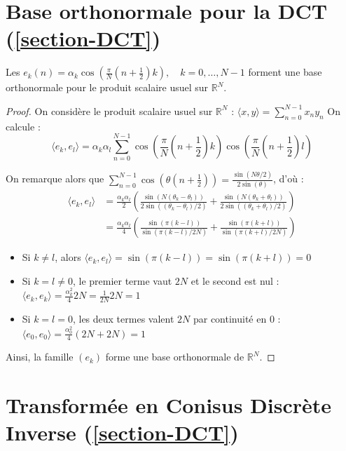\pagebreak

\section*{Base orthonormale pour la DCT (\ref{section-DCT})}
\label{preuve-base-DCT}

Les $ e_k(n) = \alpha_k \cos\left(\frac{\pi}{N}\left(n+\frac{1}{2}\right)k\right),\quad k=0,\dots,N-1 $ forment une base orthonormale pour le produit scalaire usuel sur $\mathbb{R}^N$.
\begin{proof}
    On considère le produit scalaire usuel sur $\mathbb{R}^N$ :
    $ \langle x,y\rangle = \sum_{n=0}^{N-1} x_ny_n $
    On calcule :
    $$
        \langle e_k,e_l\rangle = \alpha_k \alpha_l \sum_{n=0}^{N-1} \cos\left(\frac{\pi}{N}\left(n+\frac{1}{2}\right)k\right) \cos\left(\frac{\pi}{N}\left(n+\frac{1}{2}\right)l\right)
    $$

        On remarque alors que $\sum_{n=0}^{N-1} \cos\left(\theta\left(n + \frac{1}{2}\right)\right) = \frac{\sin(N\theta/2)}{2\sin(\theta)}$, d'où :
    \begin{align*}
        \langle e_k,e_l\rangle
        &= \frac{\alpha_k \alpha_l}{2} \left( \frac{\sin(N(\theta_k - \theta_l))}{2\sin((\theta_k - \theta_l)/2)} + \frac{\sin(N(\theta_k + \theta_l))}{2\sin((\theta_k + \theta_l)/2)} \right) \\
        &= \frac{\alpha_k \alpha_l}{4} \left( \frac{\sin(\pi(k-l))}{\sin(\pi(k-l)/2N)} + \frac{\sin(\pi(k+l))}{\sin(\pi(k+l)/2N)} \right)
    \end{align*}
\begin{itemize}
    \item Si $k \neq l$, alors $\langle e_k,e_l\rangle = \sin(\pi(k-l)) = \sin(\pi(k+l)) = 0$
    \item Si $k=l \neq 0$, le premier terme vaut $2N$ et le second est nul :
    $\langle e_k,e_k\rangle = \frac{\alpha_k^2}{4} 2N = \frac{1}{2N}2N= 1$
    \item Si $k=l=0$, les deux termes valent $2N$ par continuité en 0 :
    $\langle e_0,e_0\rangle = \frac{\alpha_0^2}{4} (2N + 2N) = 1$
\end{itemize}

    Ainsi, la famille $(e_k)$ forme une base orthonormale de $\mathbb{R}^N$.
\end{proof}

\pagebreak

\section*{Transformée en Conisus Discrète Inverse (\ref{section-DCT})}
\label{preuve-IDCT}

